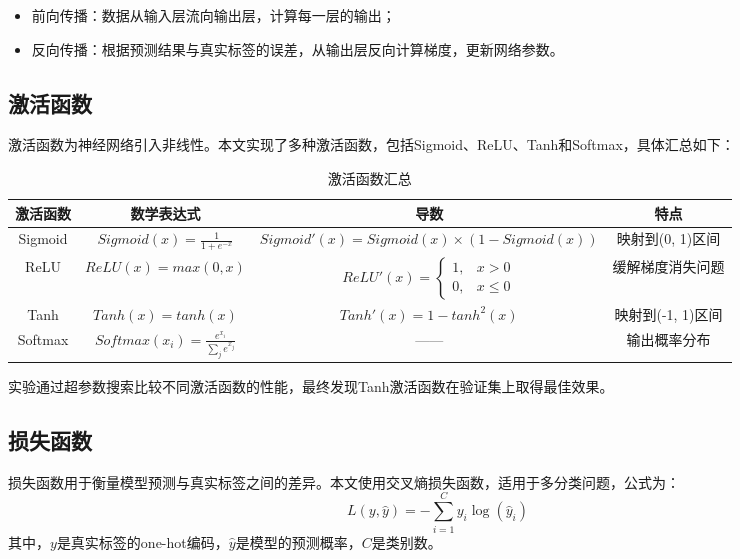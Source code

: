 \documentclass[UTF8]{article}
\begin{document}
\begin{itemize}[topsep=0pt, partopsep=0pt, itemsep=0pt, parsep=0pt]
    \item 前向传播：数据从输入层流向输出层，计算每一层的输出；
    \item 反向传播：根据预测结果与真实标签的误差，从输出层反向计算梯度，更新网络参数。
\end{itemize}

\subsection{激活函数}

激活函数为神经网络引入非线性。本文实现了多种激活函数，包括Sigmoid、ReLU、Tanh和Softmax，具体汇总如下：

\begin{table}[!htb]
    \centering
    \caption{激活函数汇总}
    \label{tab:activation_functions}
    \begin{tabular}{@{}cccc@{}}
        \toprule
        激活函数 & 数学表达式 & 导数 & 特点 \\
        \midrule
        Sigmoid & $Sigmoid(x) = \frac{1}{1 + e^{-x}}$ & $Sigmoid'(x) = Sigmoid(x) \times (1 - Sigmoid(x))$ & 映射到(0, 1)区间 \\
        ReLU & $ReLU(x) = max(0, x)$ & $ReLU'(x) = \begin{cases} 1, & x > 0 \\ 0, & x \leq 0 \end{cases}$ & 缓解梯度消失问题 \\
        Tanh & $Tanh(x) = tanh(x)$ & $Tanh'(x) = 1 - tanh^2(x)$ & 映射到(-1, 1)区间 \\
        Softmax & $Softmax(x_i) = \frac{e^{x_i}}{\sum_j e^{x_j}}$ & —— & 输出概率分布 \\
        \bottomrule
    \end{tabular}
\end{table}

实验通过超参数搜索比较不同激活函数的性能，最终发现Tanh激活函数在验证集上取得最佳效果。

\subsection{损失函数}

损失函数用于衡量模型预测与真实标签之间的差异。本文使用交叉熵损失函数，适用于多分类问题，公式为：
$$L(y, \hat{y}) = -\sum_{i=1}^{C} y_i \log(\hat{y}_i)$$
其中，$y$是真实标签的one-hot编码，$\hat{y}$是模型的预测概率，$C$是类别数。
\end{document}
